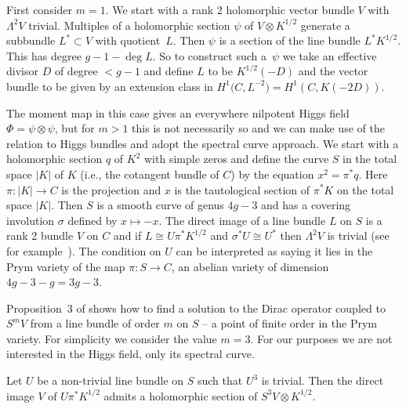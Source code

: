  First consider $m=1$.
We start with a rank 2 holomorphic vector bundle $V$ with $\Lambda^2V$ trivial. Multiples of a holomorphic section $\psi$ of $V\otimes K^{1/2}$ generate a subbundle $L^*\subset V$ with quotient~$L$. Then $\psi$ is a section of the line bundle $L^*K^{1/2}$. This has degree $g-1-\deg L$. So to construct such a~$\psi$ we take an effective divisor $D$ of degree $< g-1$ and define $L$ to be $K^{1/2}(-D)$ and the vector bundle to be given by an extension class in $H^1\big(C,L^{-2}\big)=H^1(C,K(-2D))$.

The moment map in this case gives an everywhere nilpotent Higgs field $\Phi=\psi\otimes \psi$, but for $m>1$ this is not necessarily so and we can make use of the relation to Higgs bundles and adopt the spectral curve approach.
We start with a holomorphic section $q$ of $K^2$ with simple zeros and define the curve $S$ in the total space $\vert K\vert$ of $K$ (i.e., the cotangent bundle of $C$) by the equation $x^2=\pi^*q$. Here $\pi\colon \vert K\vert \rightarrow C$ is the projection and $x$ is the tautological section of $\pi^*K$ on the total space $\vert K\vert $. Then $S$ is a smooth curve of genus $4g-3$ and has a covering involution $\sigma$ defined by $x\mapsto-x$. The direct image of a line bundle $L$ on $S$ is a rank 2 bundle $V$ on $C$ and if $L\cong U\pi^*K^{1/2}$ and $\sigma^*U\cong U^*$ then $\Lambda^2V$ is trivial (see for example~\cite{BeauvilleA/NarasimhanM/RamananS}). The condition on $U$ can be interpreted as saying it lies in the Prym variety of the map $\pi\colon S\rightarrow C$, an abelian variety of dimension $4g-3-g=3g-3$.

Proposition~3 of \cite{Hitchin2} shows how to find a solution to the Dirac operator coupled to $S^mV$ from a line bundle of order $m$ on $S$ -- a point of finite order in the Prym variety. For simplicity we consider the value $m=3$. For our purposes we are not interested in the Higgs field, only its spectral curve.

\begin{proposition} Let $U$ be a non-trivial line bundle on $S$ such that $U^3$ is trivial. Then the direct image $V$ of $U\pi^*K^{1/2}$ admits a holomorphic section of $S^3V\otimes K^{1/2}$.
\end{proposition}


